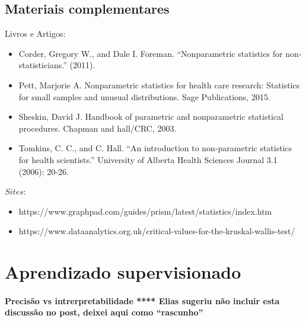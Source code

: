 \documentclass[
  letterpaper,
  DIV=11,
  numbers=noendperiod]{scrreprt}
\begin{document}
\hypertarget{materiais-complementares-1}{%
\section{Materiais complementares}\label{materiais-complementares-1}}

Livros e Artigos:

\begin{itemize}
\item
  Corder, Gregory W., and Dale I. Foreman. ``Nonparametric statistics
  for non‐statisticians.'' (2011).
\item
  Pett, Marjorie A. Nonparametric statistics for health care research:
  Statistics for small samples and unusual distributions. Sage
  Publications, 2015.
\item
  Sheskin, David J. Handbook of parametric and nonparametric statistical
  procedures. Chapman and hall/CRC, 2003.
\item
  Tomkins, C. C., and C. Hall. ``An introduction to non-parametric
  statistics for health scientists.'' University of Alberta Health
  Sciences Journal 3.1 (2006): 20-26.
\end{itemize}

\(Sites\):

\begin{itemize}
\item
  https://www.graphpad.com/guides/prism/latest/statistics/index.htm
\item
  https://www.dataanalytics.org.uk/critical-values-for-the-kruskal-wallis-test/
\end{itemize}


\hypertarget{aprendizado-supervisionado}{%
\chapter{Aprendizado supervisionado}\label{aprendizado-supervisionado}}

\hypertarget{precisuxe3o-vs-intrerpretabilidade-elias-sugeriu-nuxe3o-incluir-esta-discussuxe3o-no-post-deixei-aqui-como-rascunho}{%
\subsubsection{Precisão vs intrerpretabilidade **** Elias sugeriu não
incluir esta discussão no post, deixei aqui como
``rascunho''}\label{precisuxe3o-vs-intrerpretabilidade-elias-sugeriu-nuxe3o-incluir-esta-discussuxe3o-no-post-deixei-aqui-como-rascunho}}
\end{document}
